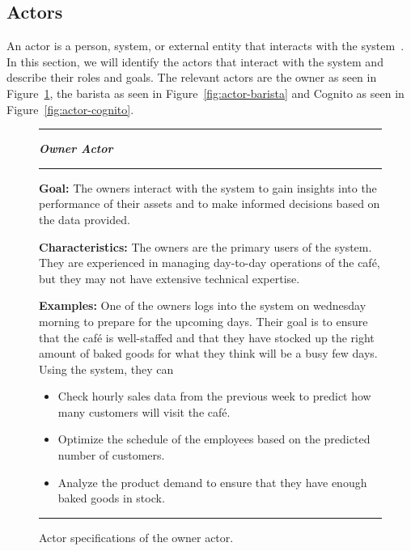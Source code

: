 \subsection{Actors}\label{subsec:actors}

An actor is a person, system, or external entity that interacts with the system~\cite{mathiassen2018}.
In this section, we will identify the actors that interact with the system and describe their roles and goals.
The relevant actors are the owner as seen in Figure~\ref{fig:actor-owner}, the barista as seen in
Figure~\ref{fig:actor-barista} and Cognito as seen in Figure~\ref{fig:actor-cognito}.

\begin{figure}[H]
    \noindent
    \rule{\textwidth}{0.4pt}

    \begin{center}
    \noindent
    \textit{\textbf{Owner Actor}}
    \end{center}

    \noindent
    \rule{\textwidth}{0.4pt}
    \noindent

    \textbf{Goal:} The owners interact with the system to gain insights into the performance of their assets
    and to make informed decisions based on the data provided.
    \newline
    \noindent

    \textbf{Characteristics:} The owners are the primary users of the system.
    They are experienced in managing day-to-day operations of the café, but they may not have extensive technical
    expertise.
    \newline
    \noindent

    \textbf{Examples:} One of the owners logs into the system on wednesday morning to prepare for the upcoming days.
    Their goal is to ensure that the café is well-staffed and that they have stocked up the right amount of baked goods
    for what they think will be a busy few days.
    Using the system, they can

    \begin{itemize}
        \item Check hourly sales data from the previous week to predict how many customers will
        visit the café.
        \item Optimize the schedule of the employees based on the predicted number of customers.
        \item Analyze the product demand to ensure that they have enough baked goods in stock.
    \end{itemize}

    \noindent
    \rule{\textwidth}{0.4pt}
    \caption{Actor specifications of the owner actor.
    }\label{fig:actor-owner}
\end{figure}

